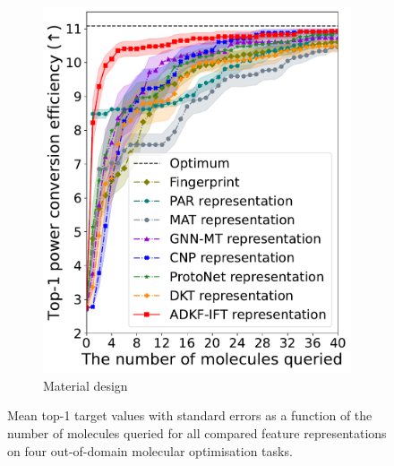 \begin{figure}[ht]
\begin{subfigure}{.24\textwidth}
            \includegraphics[width=\textwidth]{BO-opv.pdf}
            \caption{Material design}
            \label{fig:bo-opv}
        \end{subfigure}
        \caption[Top-K scores on out-of-domain molecular design tasks.]{Mean top-1 target values with standard errors as a function of the number of molecules queried for all compared feature representations on four out-of-domain molecular optimisation tasks.}
        \label{fig:bo}
    \end{figure}
    
